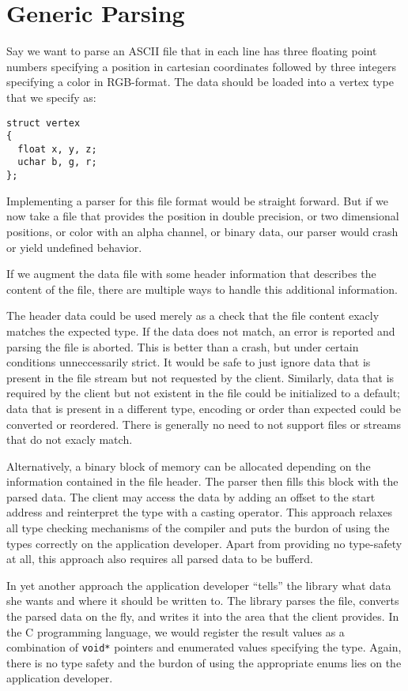 \section{Generic Parsing}

Say we want to parse an ASCII file that in each line has three floating point
numbers specifying a position in cartesian coordinates followed by three
integers specifying a color in RGB-format. The data should be loaded into a
vertex type that we specify as:

\begin{lstlisting}[frame=tb,label=vertex,caption=Vertex Example]
struct vertex
{
  float x, y, z;
  uchar b, g, r;
};
\end{lstlisting}

Implementing a parser for this file format would be straight forward. But if we
now take a file that provides the position in double precision, or two
dimensional positions, or color with an alpha channel, or binary data, our
parser would crash or yield undefined behavior.

If we augment the data file with some header information that describes the
content of the file, there are multiple ways to handle this additional
information.

The header data could be used merely as a check that the file content exacly
matches the expected type. If the data does not match, an error is reported and
parsing the file is aborted. This is better than a crash, but under certain
conditions unneccessarily strict. It would be safe to just ignore data that is
present in the file stream but not requested by the client. Similarly, data that
is required by the client but not existent in the file could be initialized to a
default; data that is present in a different type, encoding or order than
expected could be converted or reordered. There is generally no need to not
support files or streams that do not exacly match.

Alternatively, a binary block of memory can be allocated depending on the
information contained in the file header. The parser then fills this block with
the parsed data. The client may access the data by adding an offset to the start
address and reinterpret the type with a casting operator. This approach relaxes
all type checking mechanisms of the compiler and puts the burdon of using the
types correctly on the application developer. Apart from providing no
type-safety at all, this approach also requires all parsed data to be bufferd.

In yet another approach the application developer \enquote{tells} the library
what data she wants and where it should be written to. The library parses the
file, converts the parsed data on the fly, and writes it into the area that the
client provides. In the C programming language, we would register the result
values as a combination of \texttt{void*} pointers and enumerated values
specifying the type. Again, there is no type safety and the burdon of using the
appropriate enums lies on the application developer.

